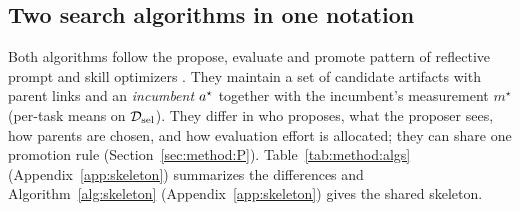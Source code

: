 \subsection{Two search algorithms in one notation}
\label{sec:method:algs}

Both algorithms follow the propose, evaluate and promote pattern of reflective prompt and skill optimizers \citep{gepa,skillopt}. They maintain a set of candidate artifacts with parent links and an \emph{incumbent} $a^\star$
together with the incumbent's measurement $m^\star$ (per-task means on $\mathcal{D}_{\mathrm{sel}}$). They differ in who proposes, what the
proposer sees, how parents are chosen, and how evaluation effort is allocated; they can share one promotion rule
(Section~\ref{sec:method:P}). Table~\ref{tab:method:algs} (Appendix~\ref{app:skeleton}) summarizes the differences and
Algorithm~\ref{alg:skeleton} (Appendix~\ref{app:skeleton}) gives the shared skeleton.





